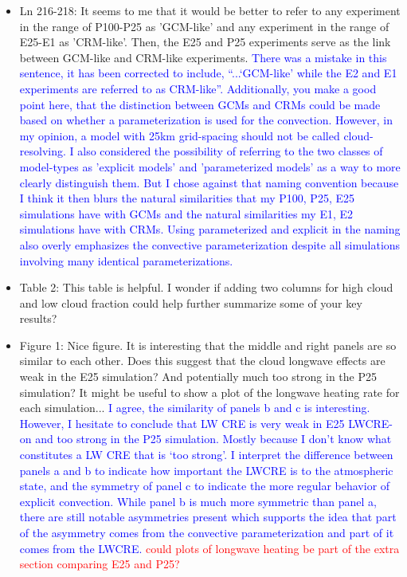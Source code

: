 \documentclass[draft]{agujournal2019}
\begin{document}
\begin{itemize}
  \item Ln 216-218: It seems to me that it would be better to refer to any experiment in the range of P100-P25 as 'GCM-like' and any experiment in the range of E25-E1 as 'CRM-like'. Then, the E25 and P25 experiments serve as the link between GCM-like and CRM-like experiments.
  \textcolor{blue}{There was a mistake in this sentence, it has been corrected to include, ``...`GCM-like' while the E2 and E1
  experiments are referred to as CRM-like''. Additionally, you make a good point here, that the distinction between GCMs and CRMs could be made based on whether a 
  parameterization is used for the convection.  However, in my opinion, a model with 25km grid-spacing should not be called cloud-resolving.  I also considered the possibility of referring to the two classes of model-types as 'explicit models' and 'parameterized models' as a way to more clearly distinguish them.  But I chose against that naming convention because I think it then blurs the natural similarities that my P100, P25, E25 simulations have with GCMs and the natural similarities my E1, E2 simulations have with CRMs.  Using parameterized and explicit in the naming also overly emphasizes the convective parameterization despite all simulations involving many identical parameterizations.}
  
  \item Table 2:  This table is helpful. I wonder if adding two columns for high cloud and low cloud fraction could help further summarize some of your key results?
  
  \item Figure 1: Nice figure. It is interesting that the middle and right panels are so similar to each other. Does this suggest that the cloud longwave effects are weak in the E25 simulation? And potentially much too strong in the P25 simulation? It might be useful to show a plot of the longwave heating rate for each simulation...  
  \textcolor{blue}{I agree, the similarity of panels b and c is interesting.  However, I hesitate to conclude that LW CRE is very weak in E25 LWCRE-on and 
  too strong in the P25 simulation.  Mostly because I don't know what constitutes a LW CRE that is `too strong'.  I interpret the difference between panels
  a and b to indicate how important the LWCRE is to the atmospheric state, and the symmetry of panel c to indicate the more regular behavior of explicit convection.
  While panel b is much more symmetric than panel a, there are still notable asymmetries present which supports the idea that part of the asymmetry comes from the convective parameterization and part of it comes from the LWCRE. }
  \textcolor{red}{could plots of longwave heating be part of the extra section comparing E25 and P25?}
  

\end{itemize}
\end{document}
